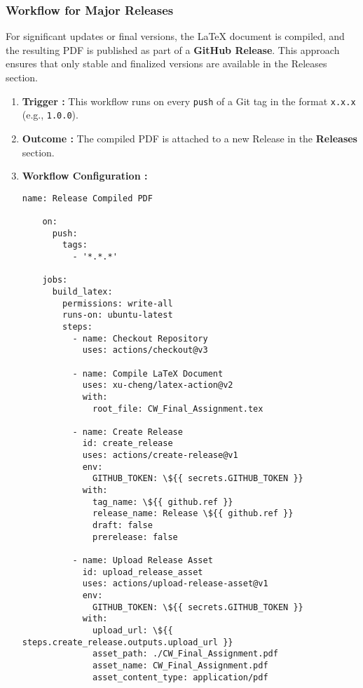 \documentclass[12pt]{article}
\begin{document}
\subsubsection{Workflow for Major Releases}

For significant updates or final versions, the LaTeX document is compiled, and the resulting PDF is published as part of a \textbf{GitHub Release}. This approach ensures that only stable and finalized versions are available in the Releases section.

\begin{enumerate}
    \item \textbf{Trigger :} This workflow runs on every \texttt{push} of a Git tag in the format \texttt{x.x.x} (e.g., \texttt{1.0.0}).
    \item \textbf{Outcome :} The compiled PDF is attached to a new Release in the \textbf{Releases} section.
    \item \textbf{Workflow Configuration :}
    \begin{lstlisting}[caption=Workflow for Major Releases]
    name: Release Compiled PDF

    on:
      push:
        tags:
          - '*.*.*'

    jobs:
      build_latex:
        permissions: write-all
        runs-on: ubuntu-latest
        steps:
          - name: Checkout Repository
            uses: actions/checkout@v3

          - name: Compile LaTeX Document
            uses: xu-cheng/latex-action@v2
            with:
              root_file: CW_Final_Assignment.tex

          - name: Create Release
            id: create_release
            uses: actions/create-release@v1
            env:
              GITHUB_TOKEN: \${{ secrets.GITHUB_TOKEN }}
            with:
              tag_name: \${{ github.ref }}
              release_name: Release \${{ github.ref }}
              draft: false
              prerelease: false

          - name: Upload Release Asset
            id: upload_release_asset
            uses: actions/upload-release-asset@v1
            env:
              GITHUB_TOKEN: \${{ secrets.GITHUB_TOKEN }}
            with:
              upload_url: \${{ steps.create_release.outputs.upload_url }}
              asset_path: ./CW_Final_Assignment.pdf
              asset_name: CW_Final_Assignment.pdf
              asset_content_type: application/pdf
    \end{lstlisting}
\end{enumerate}
\end{document}
